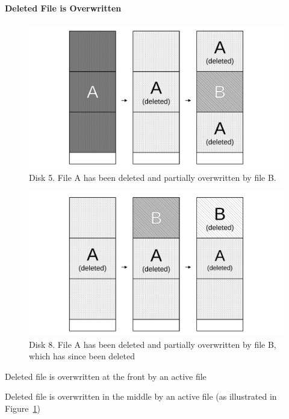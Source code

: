 \paragraph{Deleted File is Overwritten}
\begin{arabiclist}
\setcounter{enumi}{3}
    \begin{figure}
        \centering
        \includegraphics[width=\linewidth]{fig/case5.pdf}
        \caption{Disk 5. File A has been deleted and partially overwritten by file B.}
        \label{fig:case5}
    \end{figure}
    \begin{figure}[h]
        \centering
        \includegraphics[width=\linewidth]{fig/case8.pdf}
        \caption{Disk 8. File A has been deleted and partially overwritten by file B, which has since been deleted}
        \label{fig:case8}
    \end{figure}
    \item Deleted file is overwritten at the front by an active file
    \item Deleted file is overwritten in the middle by an active file (as illustrated in Figure~\ref{fig:case5})

\end{arabiclist}
